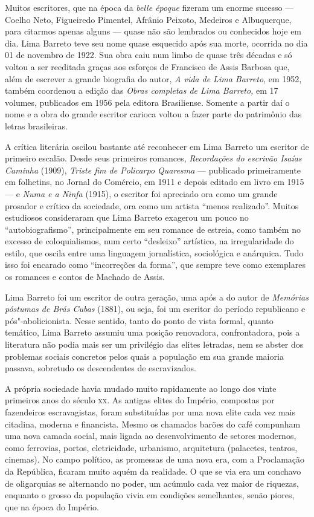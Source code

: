 \documentclass[11pt]{extarticle}
\begin{document}
Muitos escritores, que na época da \emph{belle époque} fizeram um enorme
sucesso --- Coelho Neto, Figueiredo Pimentel, Afrânio Peixoto, Medeiros e
Albuquerque, para citarmos apenas alguns --- quase não são lembrados ou
conhecidos hoje em dia. Lima Barreto teve seu nome quase esquecido após
sua morte, ocorrida no dia 01 de novembro de 1922. Sua obra caiu num
limbo de quase três décadas e só voltou a ser reeditada graças aos
esforços de Francisco de Assis Barbosa que, além de escrever a grande
biografia do autor, \emph{A vida de Lima Barreto}, em 1952, também
coordenou a edição das \emph{Obras completas de Lima Barreto,} em 17
volumes, publicados em 1956 pela editora Brasiliense. Somente a partir
daí o nome e a obra do grande escritor carioca voltou a fazer parte do
patrimônio das letras brasileiras.

A crítica literária oscilou bastante até reconhecer em Lima Barreto um
escritor de primeiro escalão. Desde seus primeiros romances,
\emph{Recordações do escrivão Isaías Caminha} (1909), \emph{Triste fim
de Policarpo Quaresma} --- publicado primeiramente em folhetins, no
Jornal do Comércio, em 1911 e depois editado em livro em 1915 --- e
\emph{Numa e a Ninfa} (1915), o escritor foi apreciado ora como um
grande prosador e crítico da sociedade, ora como um artista ``menos
realizado''. Muitos estudiosos consideraram que Lima Barreto exagerou um
pouco no ``autobiografismo'', principalmente em seu romance de estreia,
como também no excesso de coloquialismos, num certo ``desleixo''
artístico, na irregularidade do estilo, que oscila entre uma linguagem
jornalística, sociológica e anárquica. Tudo isso foi encarado como
``incorreções da forma'', que sempre teve como exemplares os romances e
contos de Machado de Assis.

Lima Barreto foi um escritor de outra geração, uma após a do autor de
\emph{Memórias póstumas de Brás Cubas} (1881), ou seja, foi um escritor
do período republicano e pós"-abolicionista. Nesse sentido, tanto do
ponto de vista formal, quanto temático, Lima Barreto assumiu uma posição
renovadora, confrontadora, pois a literatura não podia mais ser um
privilégio das elites letradas, nem se abster dos problemas sociais
concretos pelos quais a população em sua grande maioria passava,
sobretudo os descendentes de escravizados.

A própria sociedade havia mudado muito rapidamente ao longo dos vinte
primeiros anos do século \textsc{xx}. As antigas elites do Império, compostas por
fazendeiros escravagistas, foram substituídas por uma nova elite cada
vez mais citadina, moderna e financista. Mesmo os chamados barões do
café compunham uma nova camada social, mais ligada ao desenvolvimento de
setores modernos, como ferrovias, portos, eletricidade, urbanismo,
arquitetura (palacetes, teatros, cinemas). No campo político, as
promessas de uma nova era, com a Proclamação da República, ficaram muito
aquém da realidade. O que se via era um conchavo de oligarquias se
alternando no poder, um acúmulo cada vez maior de riquezas, enquanto o
grosso da população vivia em condições semelhantes, senão piores, que na
época do Império.
\end{document}

